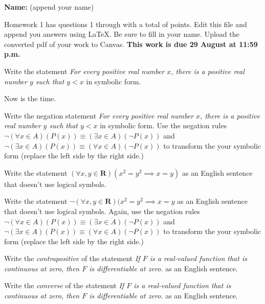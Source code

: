 \documentclass[12pt,fleqn,answers]{exam}
\newcommand{\reals}{\mathbf{R}}
\newcommand{\quiz}{1}
\newcommand{\term}{Spring}
\begin{document}
\large
\vspace{0.1in}
\noindent{}
{\bf Name:} (append your name) \\
\noindent \makebox[3.0truein][l]{\bf Homework   \quiz, \term \/ \the\year}
\vspace{0.1in}

\noindent  Homework    \quiz\/  has questions 1 through  \numquestions \/ with a total of  \numpoints\/  points.   Edit this file and append you answers using La\TeX. Be sure to fill in your name. Upload the converted pdf of your work to Canvas.   \textbf{This work is due 29 August  \/ \the\year at 11:59 p.m. }

\vspace{0.1in}




\begin{questions}

\question [3] Write the statement  \emph{For every positive real number \(x\), there is a positive real number \(y\) such that \( y < x\) } in symbolic form.

\begin{solution}
  Now is the time.
\end{solution}

\question [3]  Write the negation statement  \emph{For every positive real number \(x\), there is a positive real number \(y\) such that \( y < x\) } in symbolic form.  Use the negation rules 
\( \lnot (\forall x \in A)(P(x)) \equiv (\exists x \in A)(\lnot P(x)) \) and \(  \lnot (\exists x \in A)(P(x)) \equiv (\forall x \in A)(\lnot P(x)) \) to transform the your symbolic form (replace the left side by the right side.)

\question [3] Write the statement \( (\forall x,y \in \reals) (x^2 = y^2 \implies x = y) \) as an English sentence that doesn't use logical symbols.

\question [3] Write the statement \( \lnot (\forall x,y \in \reals) (x^2 = y^2 \implies x = y\) as an English sentence that doesn't use logical symbols. Again,  use the negation rules 
\( \lnot (\forall x \in A)(P(x)) \equiv (\exists x \in A)(\lnot P(x)) \) and \(  \lnot (\exists x \in A)(P(x)) \equiv (\forall x \in A)(\lnot P(x)) \) to transform the your symbolic form (replace the left side by the right side.)

\question [3] Write the \emph{contrapositive} of the statement \emph{If \(F\) is a real-valued function that is continuous at zero, then \(F\) is differentiable at zero.} as an English sentence.

\question [3] Write the \emph{converse} of the statement \emph{If \(F\) is a real-valued function that is continuous at zero, then \(F\) is differentiable at zero.} as an English sentence.


\end{questions}
\end{document}
